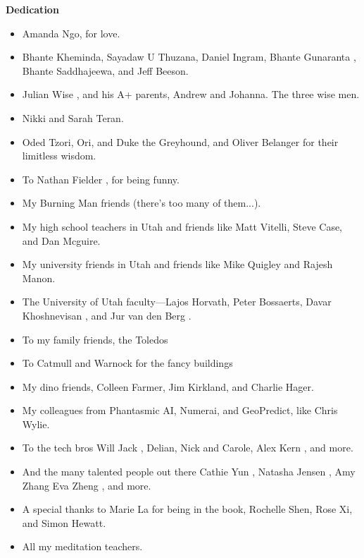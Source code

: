 \begin{titlepage}
    \centering
    {\Huge \bfseries Dedication}\par
    \vspace{2cm}
    \begin{itemize}
        \item Amanda Ngo, for love. \cite{gafori} \cite{bradway} \cite{green}
        \item Bhante Kheminda, Sayadaw U Thuzana, Daniel Ingram, Bhante Gunaranta \cite{guna} \cite{bhavana}, Bhante Saddhajeewa, and Jeff Beeson.
        \item Julian Wise \cite{yale}, and his A+ parents, Andrew and Johanna. The three wise men.
        \item Nikki and Sarah Teran.
        \item Oded Tzori, Ori, and Duke the Greyhound, and Oliver Belanger for their limitless wisdom.
        \item To Nathan Fielder \cite{foryou}, for being funny.
        \item My Burning Man friends (there's too many of them...).
        \item My high school teachers in Utah and friends like Matt Vitelli, Steve Case, and Dan Mcguire.
        \item My university friends in Utah and friends like Mike Quigley and Rajesh Manon.
        \item The University of Utah faculty—Lajos Horvath, Peter Bossaerts, Davar Khoshnevisan \cite{davar}, and Jur van den Berg \cite{utah}.
        \item To my family friends, the Toledos
        \item To Catmull and Warnock for the fancy buildings \cite{utah}
        \item My dino friends, Colleen Farmer, Jim Kirkland, and Charlie Hager.
        \item My colleagues from Phantasmic AI, Numerai, and GeoPredict, like Chris Wylie.
        \item To the tech bros Will Jack \cite{mit}, Delian, Nick and Carole, Alex Kern \cite{berkeley}, and more.
        \item And the many talented people out there Cathie Yun \cite{mit}, Natasha Jensen \cite{mit}, Amy Zhang \cite{mit} Eva Zheng \cite{berkeley}, and more.
        \item A special thanks to Marie La for being in the book, Rochelle Shen, Rose Xi, and Simon Hewatt.
        \item All my meditation teachers.

\end{itemize}
\end{titlepage}
